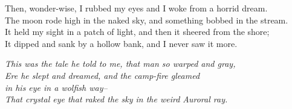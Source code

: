 \begin{poemblock}
Then, wonder-wise, I rubbed my eyes and I woke from a horrid dream.\\
The moon rode high in the naked sky, and something bobbed in the stream.\\
It held my sight in a patch of light, and then it sheered from the shore;\\
It dipped and sank by a hollow bank, and I never saw it more.

\textit{
This was the tale he told to me, that man so warped and gray,\\
\idt Ere he slept and dreamed, and the camp-fire gleamed\\
in his eye in a wolfish way--\\
\idt That crystal eye that raked the sky in the weird Auroral ray.
}
\end{poemblock}
